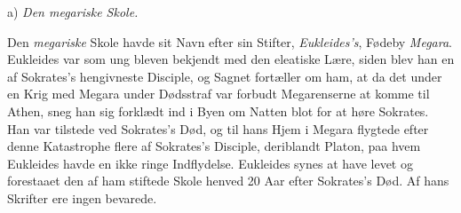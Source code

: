\documentclass[12pt,a4paper]{book}
\begin{document}
\begin{center}
a) \emph{Den megariske Skole.}
\end{center}
Den \emph{megariske} Skole havde sit Navn efter sin Stifter,
\emph{Eukleides's}, Fødeby \emph{Megara}. Eukleides var som ung
bleven bekjendt med den eleatiske Lære, siden blev han en
af Sokrates's hengivneste Disciple, og Sagnet fortæller om
ham, at da det under en Krig med Megara under Dødsstraf
var forbudt Megarenserne at komme til Athen, sneg han sig
forklædt ind i Byen om Natten blot for at høre Sokrates.
Han var tilstede ved Sokrates's Død, og til hans Hjem i
Megara flygtede efter denne Katastrophe flere af Sokrates's
Disciple, deriblandt Platon, paa hvem Eukleides havde en ikke
ringe Indflydelse. Eukleides synes at have levet og forestaaet
den af ham stiftede Skole henved 20 Aar efter Sokrates's Død.
Af hans Skrifter ere ingen bevarede.
\end{document}
